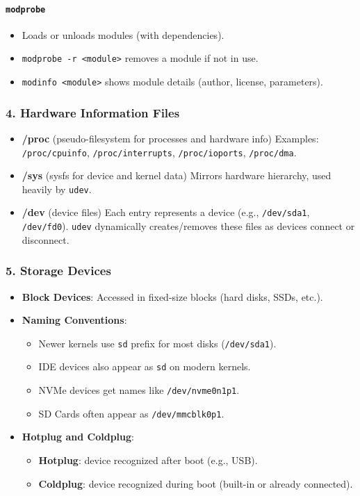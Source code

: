 \documentclass[12pt,a4paper]{report}
\begin{document}
\paragraph{\texttt{modprobe}}
\begin{itemize}
    \item Loads or unloads modules (with dependencies).
    \item \texttt{modprobe -r <module>} removes a module if not in use.
    \item \texttt{modinfo <module>} shows module details (author, license, parameters).
\end{itemize}

\subsubsection*{4. Hardware Information Files}
\begin{itemize}
    \item \textbf{/proc} (pseudo-filesystem for processes and hardware info)  
      Examples: \texttt{/proc/cpuinfo}, \texttt{/proc/interrupts}, \texttt{/proc/ioports}, \texttt{/proc/dma}.
    \item \textbf{/sys} (sysfs for device and kernel data)  
      Mirrors hardware hierarchy, used heavily by \texttt{udev}.
    \item \textbf{/dev} (device files)  
      Each entry represents a device (e.g., \texttt{/dev/sda1}, \texttt{/dev/fd0}).  
      \texttt{udev} dynamically creates/removes these files as devices connect or disconnect.
\end{itemize}

\subsubsection*{5. Storage Devices}
\begin{itemize}
    \item \textbf{Block Devices}: Accessed in fixed-size blocks (hard disks, SSDs, etc.).
    \item \textbf{Naming Conventions}:
    \begin{itemize}
      \item Newer kernels use \texttt{sd} prefix for most disks (\texttt{/dev/sda1}).
      \item IDE devices also appear as \texttt{sd} on modern kernels.
      \item NVMe devices get names like \texttt{/dev/nvme0n1p1}.
      \item SD Cards often appear as \texttt{/dev/mmcblk0p1}.
    \end{itemize}
    \item \textbf{Hotplug and Coldplug}:
    \begin{itemize}
      \item \textbf{Hotplug}: device recognized after boot (e.g., USB).
      \item \textbf{Coldplug}: device recognized during boot (built-in or already connected).
    \end{itemize}
\end{itemize}
\end{document}
